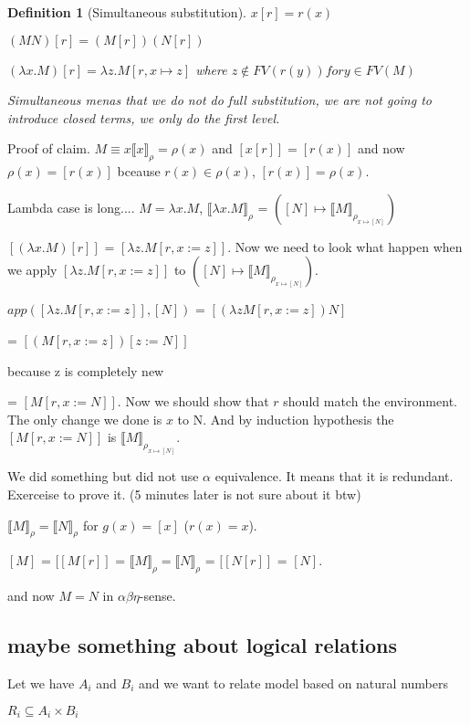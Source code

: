 \documentclass[a4paper,10pt]{book}
\newtheorem{definition}{Definition}
\newcommand{\sem}[2]{ \llbracket#1\rrbracket_{#2} }
\begin{document}
\begin{definition}[Simultaneous substitution]

$x[r] = r(x)$

$(MN)[r] = (M[r])(N[r])$

$(\lambda x . M)[r] = \lambda z . M[r, x \mapsto z] $ where $z \not\in  FV(r(y)) for y \in FV(M)$

Simultaneous menas that we do not do full substitution, we are not going to introduce closed terms,
we only do the first level.
\end{definition}

Proof of claim.
$M\equiv x    \sem{x}{\rho} = \rho(x)$ and $[x[r]] = [r(x)]$ and now $\rho(x) = [r(x)]$ bceause 
$r(x) \in \rho(x)$, $[r(x)] = \rho(x)$.

Lambda case is long....
$M=\lambda x . M$, $\sem{\lambda x . M}{\rho}$ = $([N] \mapsto \sem{M}{\rho_{x \mapsto [N]}})$

$[(\lambda x . M)[r]]$ = $[\lambda z . M[r, x:= z]]$. Now we need to look what happen when we apply
$[\lambda z . M[r, x:= z]]$ to $([N] \mapsto \sem{M}{\rho_{x \mapsto [N]}})$.

$app ([\lambda z . M[r, x:= z]], [N])$ = $[(\lambda z M [r, x:=z])N]$

 = $[(M[r, x:=z])[z:=N]]$
 
 because z is completely new 
 
 = $[M[r, x := N]]$. Now we should show that $r$ should match the environment. The only change we done
 is $x$ to N. And by induction hypothesis the $[M[r, x := N]]$ is $\sem{M}{\rho_{x \mapsto [N]}}$.
 
We did something but did not use $\alpha$ equivalence. It means that it is redundant. Exerceise to prove it.
(5 minutes later is not sure about it btw)

$\sem{M}{\rho} = \sem{N}{\rho}$ for $g(x)=[x]$ ($r(x)=x$).

 $[M]$ = $[[M[r]]$ = $\sem{M}{\rho} = \sem{N}{\rho}$ =  $[[N[r]]$ = $[N]$.
 
 and now $M=N$ in $\alpha\beta\eta$-sense.


  
\subsection{maybe something about logical relations}
Let we have $A_i$ and $B_i$ and we want to relate model based on natural numbers

$R_i \subseteq A_i \times B_i$
\end{document}
